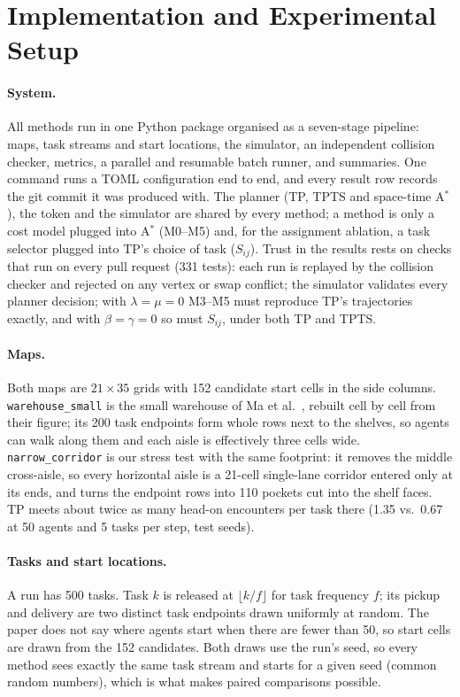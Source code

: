 
\section{Implementation and Experimental Setup}
\label{sec:setup}

\paragraph{System.}
All methods run in one Python package organised as a seven-stage pipeline:
maps, task streams and start locations, the simulator, an independent
collision checker, metrics, a parallel and resumable batch runner, and
summaries. One command runs a TOML configuration end to end, and every result
row records the git commit it was produced with. The planner (TP, TPTS and
space-time A$^*$), the token and the simulator are shared by every method;
a method is only a cost model plugged into A$^*$ (M0--M5) and, for the
assignment ablation, a task selector plugged into TP's choice of task
($S_{ij}$). Trust in the results rests on checks that run on every pull
request (331 tests): each run is replayed by the collision checker and
rejected on any vertex or swap conflict; the simulator validates every
planner decision; with $\lambda=\mu=0$ M3--M5 must reproduce TP's trajectories
exactly, and with $\beta=\gamma=0$ so must $S_{ij}$, under both TP and TPTS.

\paragraph{Maps.}
Both maps are $21\times35$ grids with 152 candidate start cells in the side
columns. \texttt{warehouse\_small} is the small warehouse of Ma et
al.~\cite{ma2017lifelong}, rebuilt cell by cell from their figure; its 200 task
endpoints form whole rows next to the shelves, so agents can walk along them
and each aisle is effectively three cells wide. \texttt{narrow\_corridor} is our
stress test with the same footprint: it removes the middle cross-aisle, so
every horizontal aisle is a 21-cell single-lane corridor entered only at its
ends, and turns the endpoint rows into 110 pockets cut into the shelf faces.
TP meets about twice as many head-on encounters per task there (1.35 vs.\ 0.67
at 50 agents and 5 tasks per step, test seeds).

\paragraph{Tasks and start locations.}
A run has 500 tasks. Task $k$ is released at $\lfloor k/f\rfloor$ for task
frequency $f$; its pickup and delivery are two distinct task endpoints drawn
uniformly at random. The paper does not say where agents start when there are
fewer than 50, so start cells are drawn from the 152 candidates. Both draws use
the run's seed, so every method sees exactly the same task stream and starts
for a given seed (common random numbers), which is what makes paired
comparisons possible.

